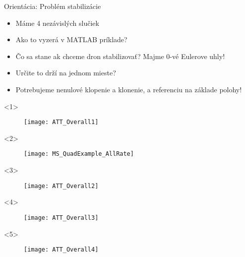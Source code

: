 \begin{frame}[t]{Orientácia: Problém stabilizácie}\
\begin{itemize}
  \item<1-> Máme 4 nezávislých slučiek
  \item<2-> Ako to vyzerá v MATLAB príklade?
  \item<3-> Čo sa stane ak chceme dron stabilizovať? Majme 0-vé Eulerove uhly!
  \item<4-> Určite to drží na jednom mieste?
  \item<5-> Potrebujeme nenulové klopenie a klonenie, a referenciu na základe polohy!
\end{itemize}
  \begin{onlyenv}<1>
\begin{figure}
\centering
  \texttt{[image: ATT\_Overall1]}\\
\end{figure}
  \end{onlyenv}
  
    \begin{onlyenv}<2>
\begin{figure}
\centering
  \texttt{[image: MS\_QuadExample\_AllRate]}\\
\end{figure}
  \end{onlyenv}
  
  
    \begin{onlyenv}<3>
\begin{figure}
\centering
  \texttt{[image: ATT\_Overall2]}\\
\end{figure}
  \end{onlyenv}
      \begin{onlyenv}<4>
\begin{figure}
\centering
  \texttt{[image: ATT\_Overall3]}\\
\end{figure}
  \end{onlyenv}
        \begin{onlyenv}<5>
\begin{figure}
\centering
  \texttt{[image: ATT\_Overall4]}\\
\end{figure}
  \end{onlyenv}

\end{frame}
